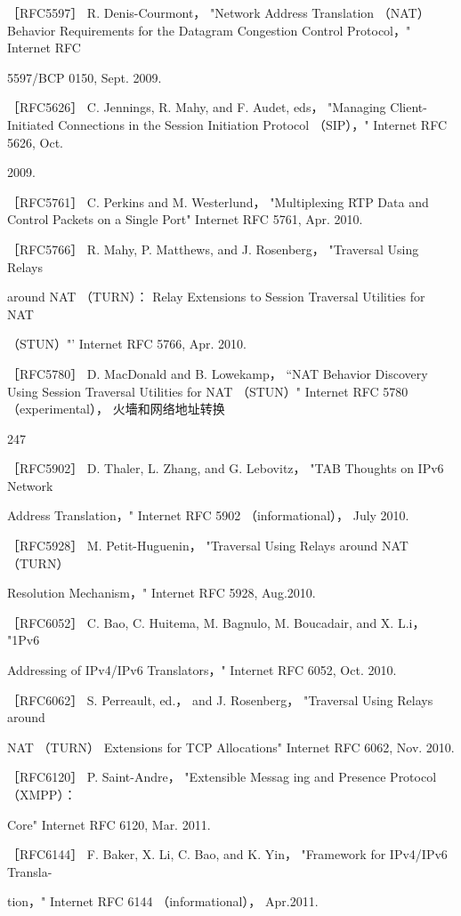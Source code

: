 ［RFC5597］ R. Denis-Courmont， "Network Address Translation （NAT） Behavior
Requirements for the Datagram Congestion Control Protocol，" Internet RFC

5597/BCP 0150, Sept. 2009.

［RFC5626］ C. Jennings, R. Mahy, and F. Audet, eds， "Managing Client-Initiated
Connections in the Session Initiation Protocol （SIP），" Internet RFC 5626, Oct.

2009.

［RFC5761］ C. Perkins and M. Westerlund， "Multiplexing RTP Data and Control
Packets on a Single Port" Internet RFC 5761, Apr. 2010.

［RFC5766］ R. Mahy, P. Matthews, and J. Rosenberg， "Traversal Using Relays

around NAT （TURN）： Relay Extensions to Session Traversal Utilities for NAT

（STUN）"' Internet RFC 5766, Apr. 2010.

［RFC5780］ D. MacDonald and B. Lowekamp， “NAT Behavior Discovery Using
Session Traversal Utilities for NAT （STUN）" Internet RFC 5780 （experimental），
火墻和网络地址转换

247

［RFC5902］ D. Thaler, L. Zhang, and G. Lebovitz， "TAB Thoughts on IPv6 Network

Address Translation，" Internet RFC 5902 （informational）， July 2010.

［RFC5928］ M. Petit-Huguenin， "Traversal Using Relays around NAT （TURN）

Resolution Mechanism，" Internet RFC 5928, Aug.2010.

［RFC6052］ C. Bao, C. Huitema, M. Bagnulo, M. Boucadair, and X. L.i， "1Pv6

Addressing of IPv4/IPv6 Translators，" Internet RFC 6052, Oct. 2010.

［RFC6062］ S. Perreault, ed.， and J. Rosenberg， "Traversal Using Relays around

NAT （TURN） Extensions for TCP Allocations" Internet RFC 6062, Nov. 2010.

［RFC6120］ P. Saint-Andre， "Extensible Messag ing and Presence Protocol （XMPP）：

Core" Internet RFC 6120, Mar. 2011.

［RFC6144］ F. Baker, X. Li, C. Bao, and K. Yin， "Framework for IPv4/IPv6 Transla-

tion，" Internet RFC 6144 （informational）， Apr.2011.

